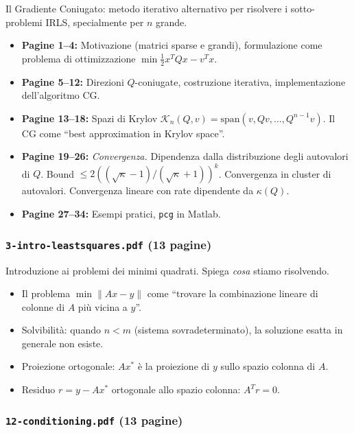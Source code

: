 \documentclass[a4paper,11pt]{article}
\theoremstyle{definition}
\newcommand{\norm}[1]{\left\lVert #1 \right\rVert}
\begin{document}
Il Gradiente Coniugato: metodo iterativo alternativo per risolvere i sotto-problemi IRLS, specialmente per $n$ grande.

\begin{itemize}
  \item \textbf{Pagine 1--4:} Motivazione (matrici sparse e grandi), formulazione come problema di ottimizzazione $\min \frac{1}{2}x^TQx - v^Tx$.
  \item \textbf{Pagine 5--12:} Direzioni $Q$-coniugate, costruzione iterativa, implementazione dell'algoritmo CG.
  \item \textbf{Pagine 13--18:} Spazi di Krylov $\mathcal{K}_n(Q, v) = \text{span}(v, Qv, \ldots, Q^{n-1}v)$. Il CG come ``best approximation in Krylov space''.
  \item \textbf{Pagine 19--26:} \emph{Convergenza.} Dipendenza dalla distribuzione degli autovalori di $Q$. Bound $\leq 2((\sqrt{\kappa}-1)/(\sqrt{\kappa}+1))^k$. Convergenza in cluster di autovalori. Convergenza lineare con rate dipendente da $\kappa(Q)$.
  \item \textbf{Pagine 27--34:} Esempi pratici, \texttt{pcg} in Matlab.
\end{itemize}

\subsubsection*{ \quad \texttt{3-intro-leastsquares.pdf} (13 pagine)}

Introduzione ai problemi dei minimi quadrati. Spiega \emph{cosa} stiamo risolvendo.

\begin{itemize}
  \item Il problema $\min\norm{Ax - y}$ come ``trovare la combinazione lineare di colonne di $A$ più vicina a $y$''.
  \item Solvibilità: quando $n < m$ (sistema sovradeterminato), la soluzione esatta in generale non esiste.
  \item Proiezione ortogonale: $Ax^*$ è la proiezione di $y$ sullo spazio colonna di $A$.
  \item Residuo $r = y - Ax^*$ ortogonale allo spazio colonna: $A^Tr = 0$.
\end{itemize}

\subsubsection*{ \quad \texttt{12-conditioning.pdf} (13 pagine)}
\end{document}
